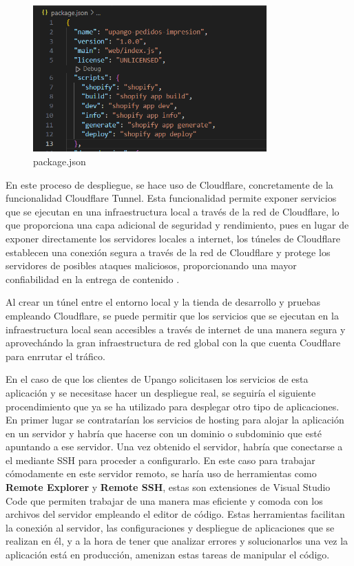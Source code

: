 \documentclass[12pt]{article}
\begin{document}
\begin{figure}[ht]
    \centering
    \includegraphics[width=0.8\textwidth]{imagenes/package.json.scripts.png}
    \caption{\label{fig:scriptsPackageJson}package.json}
    \vspace{\fill}
\end{figure}

En este proceso de despliegue, se hace uso de Cloudflare, concretamente de la funcionalidad Cloudflare Tunnel. Esta funcionalidad permite exponer servicios que se ejecutan
en una infraestructura local a través de la red de Cloudflare, lo que proporciona una capa adicional de seguridad y rendimiento, pues en lugar de 
exponer directamente los servidores locales a internet, los túneles de Cloudflare establecen una conexión segura a través de la red de Cloudflare y protege los
servidores de posibles ataques maliciosos, proporcionando una mayor confiabilidad en la entrega de contenido \cite{cloudflare}. 

Al crear un túnel entre el entorno local y la tienda de desarrollo y pruebas empleando Cloudflare, se puede permitir que los servicios que se ejecutan en la infraestructura local
sean accesibles a través de internet de una manera segura y aprovechándo la gran infraestructura de red global con la que cuenta Coudflare para enrrutar el tráfico.

En el caso de que los clientes de Upango solicitasen los servicios de esta aplicación y se necesitase hacer un despliegue real, se seguiría el siguiente procendimiento que ya se ha utilizado para
desplegar otro tipo de aplicaciones.
En primer lugar se contratarían los servicios de hosting para alojar la aplicación en un servidor y habría que hacerse con un dominio o subdominio
que esté apuntando a ese servidor. Una vez obtenido el servidor, habría que conectarse a el mediante SSH para proceder a configurarlo. En este caso para trabajar cómodamente en este servidor remoto,
se haría uso de herramientas como \textbf{Remote Explorer} y \textbf{Remote SSH}, estas son extensiones de Visual Studio Code que permiten trabajar de una manera mas eficiente y comoda con los archivos del
servidor empleando el editor de código. Estas herramientas facilitan la conexión al servidor, las configuraciones y despliegue de aplicaciones que se realizan en él, y a la hora 
de tener que analizar errores y solucionarlos una vez la aplicación está en producción, amenizan estas tareas de manipular el código.
\end{document}
